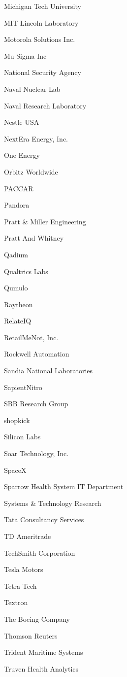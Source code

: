 \documentclass[twoside]{article}
\begin{document}
\begin{center}
\begin{multicols}{5}
\begin{FlushLeft}
\begin{compactitem}
\item Michigan Tech University
\item MIT Lincoln Laboratory
\item Motorola Solutions Inc.
\item Mu Sigma Inc
\item National Security Agency
\item Naval Nuclear Lab
\item Naval Research Laboratory
\item Nestle USA
\item NextEra Energy, Inc.
\item One Energy
\item Orbitz Worldwide
\item PACCAR
\item Pandora
\item Pratt \& Miller Engineering
\item Pratt And Whitney
\item Qadium
\item Qualtrics Labs
\item Qumulo
\item Raytheon
\item RelateIQ
\item RetailMeNot, Inc.
\item Rockwell Automation
\item Sandia National Laboratories
\item SapientNitro
\item SBB Research Group
\item shopkick
\item Silicon Labs
\item Soar Technology, Inc.
\item SpaceX
\item Sparrow Health System IT Department
\item Systems \& Technology Research
\item Tata Consultancy Services
\item TD Ameritrade
\item TechSmith Corporation
\item Tesla Motors
\item Tetra Tech
\item Textron
\item The Boeing Company
\item Thomson Reuters
\item Trident Maritime Systems
\item Truven Health Analytics

\end{compactitem}
\end{FlushLeft}
\end{multicols}
\end{center}
\end{document}
